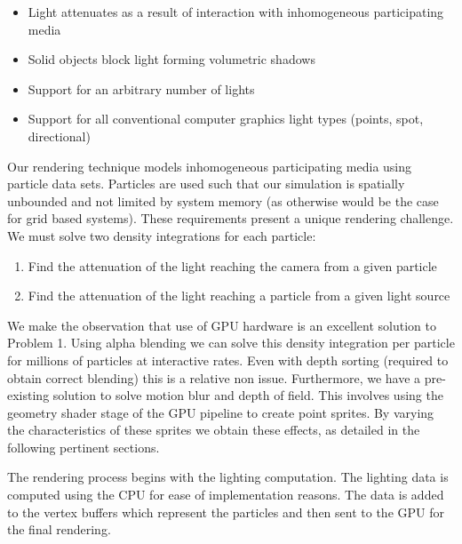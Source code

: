 \documentclass{article}
\begin{document}
\begin{itemize}

\item Light attenuates as a result of interaction with inhomogeneous participating media
\item Solid objects block light forming volumetric shadows
\item Support for an arbitrary number of lights
\item Support for all conventional computer graphics light types (points, spot, directional)

\end{itemize}

Our rendering technique models inhomogeneous participating media using particle data sets. Particles are used such that our simulation is spatially unbounded and not limited by system memory (as otherwise would be the case for grid based systems).
\newline \newline
These requirements present a unique rendering challenge. We must solve two density integrations for each particle:

\begin{enumerate}
  \item Find the attenuation of the light reaching the camera from a given particle
  \item Find the attenuation of the light reaching a particle from a given light source
\end{enumerate}

We make the observation that use of GPU hardware is an excellent solution to Problem 1. Using alpha blending we can solve this density integration per particle for millions of particles at interactive rates. Even with depth sorting (required to obtain correct blending) this is a relative non issue.
\newline \newline
Furthermore, we have a pre-existing solution\cite{fury2010} to solve motion blur and depth of field. This involves using the geometry shader stage of the GPU pipeline to create point sprites. By varying the characteristics of these sprites we obtain these effects, as detailed in the following pertinent sections.

The rendering process begins with the lighting computation. The lighting data is computed using the CPU for ease of implementation reasons. The data is added to the vertex buffers which represent the particles and then sent to the GPU for the final rendering.
\end{document}
